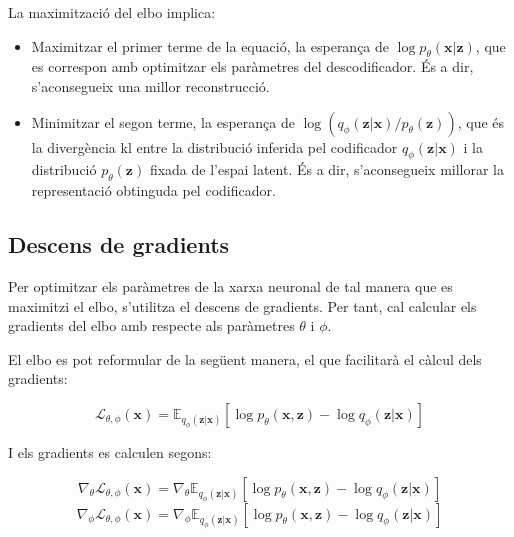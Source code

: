 \documentclass[CAT,BIB]{TFUOC}%
\begin{document}
            La maximització del \gls{elbo} implica:
            \begin{itemize}
                \item Maximitzar el primer terme de la equació,
                la esperança de $\log p_\theta(\mathbf{x|z})$,
                que es correspon amb optimitzar els paràmetres del descodificador.
                És a dir, s'aconsegueix una millor reconstrucció.

                \item Minimitzar el segon terme,
                la esperança de $\log ( q_\phi(\mathbf{z|x}) / p_\theta(\mathbf{z}) )$,
                que és la divergència \gls{kl} entre
                la distribució inferida pel codificador $q_\phi(\mathbf{z|x})$
                i la distribució $p_\theta(\mathbf{z})$ fixada de l'espai latent.
                És a dir, s'aconsegueix millorar la representació obtinguda pel codificador.
            \end{itemize}

        \subsection{Descens de gradients}
        \label{s:vae_gradients}

            Per optimitzar els paràmetres de la xarxa neuronal
            de tal manera que es maximitzi el \gls{elbo},
            s'utilitza el descens de gradients.
            Per tant, cal calcular els gradients del \gls{elbo}
            amb respecte als paràmetres $\theta$ i $\phi$.

            El \gls{elbo} es pot reformular de la següent manera,
            el que facilitarà el càlcul dels gradients:

            \begin{equation}
            \label{eq:elbo_2}
                \mathcal{L}_{\theta,\phi}(\mathbf{x}) =
                \mathbb{E}_{q_\phi(\mathbf{z|x})} [
                    \log p_\theta(\mathbf{x,z}) -
                    \log q_\phi(\mathbf{z|x})
                ]
            \end{equation}

            I els gradients es calculen segons:

            \begin{equation}
            \label{eq:gradient_theta}
                \nabla_\theta \mathcal{L}_{\theta,\phi}(\mathbf{x}) =
                \nabla_\theta \mathbb{E}_{q_\phi(\mathbf{z|x})} [
                \log p_\theta(\mathbf{x,z}) -
                \log q_\phi(\mathbf{z|x})
                ]
            \end{equation}
            \begin{equation}
            \label{eq:gradient_phi}
                \nabla_\phi \mathcal{L}_{\theta,\phi}(\mathbf{x}) =
                \nabla_\phi \mathbb{E}_{q_\phi(\mathbf{z|x})} [
                \log p_\theta(\mathbf{x,z}) -
                \log q_\phi(\mathbf{z|x})
                ]
            \end{equation}
\end{document}
